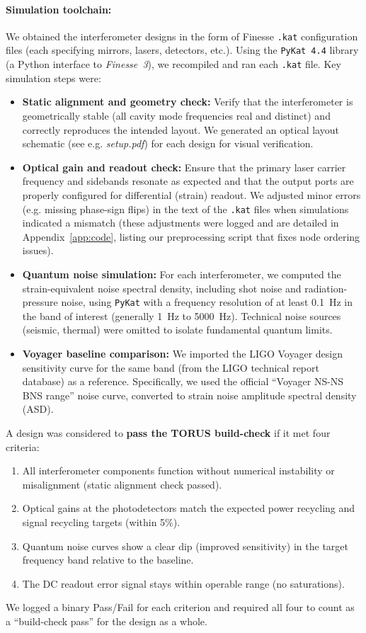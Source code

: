 \documentclass[12pt]{article}
\begin{document}
\paragraph{Simulation toolchain:} We obtained the interferometer designs in the form of Finesse \texttt{.kat} configuration files (each specifying mirrors, lasers, detectors, etc.). Using the \texttt{PyKat 4.4} library (a Python interface to \emph{Finesse~3}), we recompiled and ran each \texttt{.kat} file. Key simulation steps were:
\begin{itemize}\itemsep 0pt
    \item \textbf{Static alignment and geometry check:} Verify that the interferometer is geometrically stable (all cavity mode frequencies real and distinct) and correctly reproduces the intended layout. We generated an optical layout schematic (see e.g. \emph{setup.pdf}) for each design for visual verification.
    \item \textbf{Optical gain and readout check:} Ensure that the primary laser carrier frequency and sidebands resonate as expected and that the output ports are properly configured for differential (strain) readout. We adjusted minor errors (e.g. missing phase-sign flips) in the text of the \texttt{.kat} files when simulations indicated a mismatch (these adjustments were logged and are detailed in Appendix~\ref{app:code}, listing our preprocessing script that fixes node ordering issues).
    \item \textbf{Quantum noise simulation:} For each interferometer, we computed the strain-equivalent noise spectral density, including shot noise and radiation-pressure noise, using \texttt{PyKat} with a frequency resolution of at least 0.1~Hz in the band of interest (generally 1~Hz to 5000~Hz). Technical noise sources (seismic, thermal) were omitted to isolate fundamental quantum limits.
    \item \textbf{Voyager baseline comparison:} We imported the LIGO Voyager design sensitivity curve for the same band (from the LIGO technical report database) as a reference. Specifically, we used the official ``Voyager NS-NS BNS range'' noise curve, converted to strain noise amplitude spectral density (ASD).
\end{itemize}

A design was considered to \textbf{pass the TORUS build-check} if it met four criteria:
\begin{enumerate}\itemsep 0pt
    \item All interferometer components function without numerical instability or misalignment (static alignment check passed).
    \item Optical gains at the photodetectors match the expected power recycling and signal recycling targets (within 5\%).
    \item Quantum noise curves show a clear dip (improved sensitivity) in the target frequency band relative to the baseline.
    \item The DC readout error signal stays within operable range (no saturations).
\end{enumerate}
We logged a binary Pass/Fail for each criterion and required all four to count as a “build-check pass” for the design as a whole.
\end{document}
